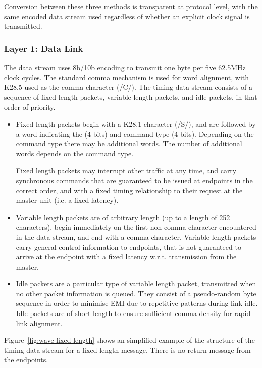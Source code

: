 \documentclass{dune}
\begin{document}
Conversion between these three methods is transparent at protocol level, with the same encoded data stream used regardless of whether an explicit clock signal is transmitted.

\subsubsection{Layer 1: Data Link}

The data stream uses 8b/10b encoding to transmit one byte per five 62.5MHz clock cycles. The standard comma mechanism is used for word alignment, with K28.5 used as the comma character (/C/). The timing data stream consists of a sequence of fixed length packets, variable length packets, and idle packets, in that order of priority.

\begin{itemize}
	\item Fixed length packets begin with a K28.1 character (/S/), and are followed by a word indicating the  (4 bits) and command type (4 bits). Depending on the command type there may be additional words. The number of additional words depends on the command type.
	 
	 Fixed length packets may interrupt other traffic at any time, and carry synchronous commands that are guaranteed to be issued at endpoints in the correct order, and with a fixed timing relationship to their request at the master unit (i.e. a fixed latency).
	\item Variable length packets are of arbitrary length (up to a length of 252 characters), begin immediately on the first non-comma character encountered in the data stream, and end with a comma character. Variable length packets carry general control information to endpoints, that is not guaranteed to arrive at the endpoint with a fixed latency w.r.t. transmission from the master.
	\item Idle packets are a particular type of variable length packet, transmitted when no other packet information is queued. They consist of a pseudo-random byte sequence in order to minimise EMI due to repetitive patterns during link idle. Idle packets are of short length to ensure sufficient comma density for rapid link alignment.
\end{itemize}

Figure~\ref{fig:wave-fixed-length} shows an simplified example of the structure of the timing data stream for a fixed length message. There is no return message from the endpoints. 
\end{document}
